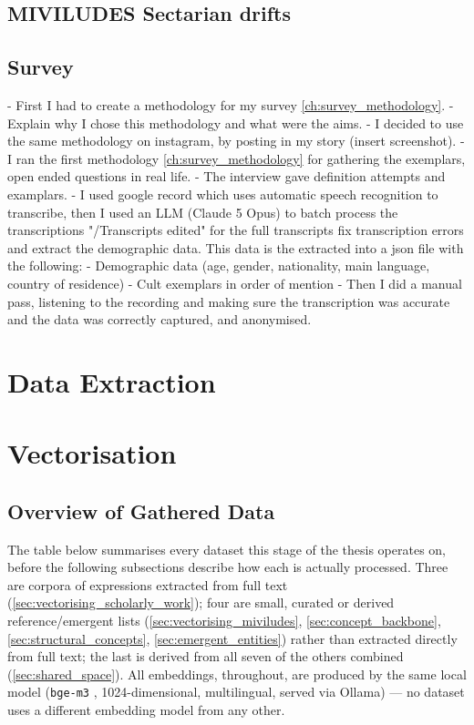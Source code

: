 \subsection{MIVILUDES Sectarian drifts}
\subsection{Survey}
- First I had to create a methodology for my survey \ref{ch:survey_methodology}. 
- Explain why I chose this methodology and what were the aims.
- I decided to use the same methodology on instagram, by posting in my story (insert screenshot).
- I ran the first methodology \ref{ch:survey_methodology} for gathering the exemplars, open ended questions in real life. 
- The interview gave definition attempts and examplars.
- I used google record \autocite{google_recorder_2026} which uses automatic speech recognition to transcribe, then I used an LLM (Claude 5 Opus) to batch process the transcriptions "/Transcripts edited" for the full transcripts fix transcription errors and extract the demographic data. 
This data is the extracted into a json file with the following:
	- Demographic data (age, gender, nationality, main language, country of residence)
	- Cult exemplars in order of mention
- Then I did a manual pass, listening to the recording and making sure the transcription was accurate and the data was correctly captured, and anonymised.


\section{Data Extraction}

\section{Vectorisation}

\subsection{Overview of Gathered Data}\label{sec:vectorisation_data_overview}
The table below summarises every dataset this stage of the thesis operates on, before the following subsections describe how each is actually processed. Three are corpora of expressions extracted from full text (\ref{sec:vectorising_scholarly_work}); four are small, curated or derived reference/emergent lists (\ref{sec:vectorising_miviludes}, \ref{sec:concept_backbone}, \ref{sec:structural_concepts}, \ref{sec:emergent_entities}) rather than extracted directly from full text; the last is derived from all seven of the others combined (\ref{sec:shared_space}). All embeddings, throughout, are produced by the same local model (\texttt{bge-m3} \autocite{chenM3EmbeddingMultiLingualityMultiFunctionality2025}, 1024-dimensional, multilingual, served via Ollama) — no dataset uses a different embedding model from any other.

